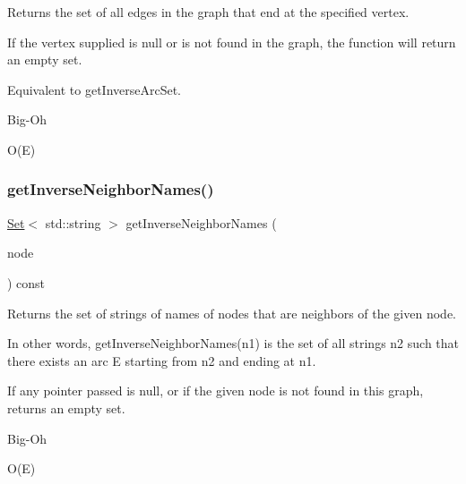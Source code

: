 Returns the set of all edges in the graph that end at the specified vertex. 

If the vertex supplied is null or is not found in the graph, the function will return an empty set.

Equivalent to get\+Inverse\+Arc\+Set. \begin{DoxyRefDesc}{Big-\/\+Oh}
\item[\mbox{\hyperlink{BigOh__BigOh000025}{Big-\/\+Oh}}]O(\+E) \end{DoxyRefDesc}
\mbox{\label{classGraph_aa9eceee00e824ea4852449fa3de61e82}} 
\subsubsection{\texorpdfstring{get\+Inverse\+Neighbor\+Names()}{getInverseNeighborNames()}\hspace{0.1cm}{\footnotesize\ttfamily [1/2]}}
{\footnotesize\ttfamily \mbox{\hyperlink{classstanfordcpplib_1_1collections_1_1GenericSet}{Set}}$<$ std\+::string $>$ get\+Inverse\+Neighbor\+Names (\begin{DoxyParamCaption}\item[{\mbox{\hyperlink{classVertexGen}{Vertex\+Gen}}$<$ V, E $>$  $\ast$}]{node }\end{DoxyParamCaption}) const\hspace{0.3cm}{\ttfamily [inherited]}}



Returns the set of strings of names of nodes that are neighbors of the given node. 

In other words, get\+Inverse\+Neighbor\+Names(n1) is the set of all strings n2 such that there exists an arc E starting from n2 and ending at n1.

If any pointer passed is null, or if the given node is not found in this graph, returns an empty set. \begin{DoxyRefDesc}{Big-\/\+Oh}
\item[\mbox{\hyperlink{BigOh__BigOh000067}{Big-\/\+Oh}}]O(\+E) \end{DoxyRefDesc}
\mbox{\label{classGraph_ac3dc36bc1eb0f249180cfe78bce6e7a2}} 
